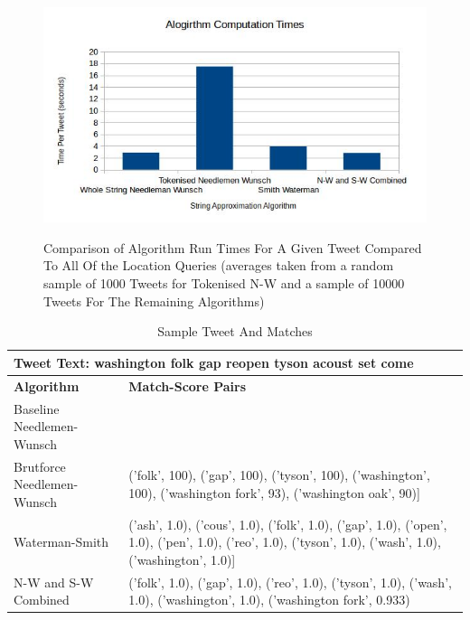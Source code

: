 \documentclass[11pt,a4paper]{article}
\begin{document}



\begin{figure}[ht]
	\centering
	\includegraphics[scale=0.8]{times1.jpg}
	\label{fig:times-graph}
	\caption{Comparison of Algorithm Run Times For A Given Tweet Compared To All Of the Location Queries (averages taken from a random sample of 1000 Tweets for Tokenised N-W and a sample of 10000 Tweets For The Remaining Algorithms)}
\end{figure}

\begin{table} [h]
\caption{Sample Tweet And Matches}
\begin{center}
	\begin{tabular}{| p{5.5cm} | p{10cm} |}
	\hline
	\multicolumn{2}{|p{15.5cm}|}{\textbf{Tweet Text:} washington folk gap reopen tyson acoust set come } \\
	\hline
	\textbf{Algorithm} & \textbf{Match-Score Pairs}\\
	\hline
	Baseline Needlemen-Wunsch & \\
	\hline
	Brutforce Needlemen-Wunsch & ('folk', 100), ('gap', 100), ('tyson', 100), ('washington', 100), ('washington fork', 93), ('washington oak', 90)]\\
	\hline
	Waterman-Smith & ('ash', 1.0), ('cous', 1.0), ('folk', 1.0), ('gap', 1.0), ('open', 1.0), ('pen', 1.0), ('reo', 1.0), ('tyson', 1.0), ('wash', 1.0), ('washington', 1.0)]\\
	\hline
	N-W and S-W Combined & ('folk', 1.0), ('gap', 1.0), ('reo', 1.0), ('tyson', 1.0), ('wash', 1.0), ('washington', 1.0), ('washington fork', 0.933)\\
	\hline
	\end{tabular}
\end{center}
\label{table:alg-table1}
\end{table}
\end{document}
